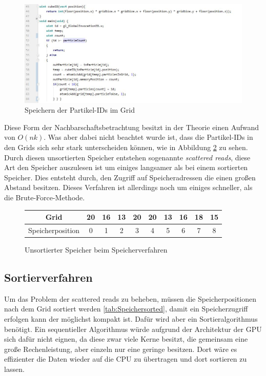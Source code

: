 \documentclass[intern,palatino]{cgBA}
\begin{document}
\begin{figure}[H]
	\centering
	\includegraphics[width=1.3\columnwidth]{Bilder/StoringLable.jpg}
	\caption{Speichern der Partikel-IDs im Grid }
	\label{img:Storinglable}
\end{figure}

Diese Form der Nachbarschaftsbetrachtung besitzt in der Theorie einen Aufwand von $O(n k)$. Was aber dabei nicht beachtet wurde ist, dass die Partikel-IDs in den Grids sich sehr stark unterscheiden können, wie in Abbildung \ref{tab:Speicher} zu sehen.
\newline
Durch diesen unsortierten Speicher entstehen sogenannte \textit{scattered reads}, diese Art den Speicher auszulesen ist um einiges langsamer als bei einem sortierten Speicher. Dies entsteht durch, den Zugriff auf Speicheradressen die einen großen Abstand besitzen.
\newline
Dieses Verfahren ist allerdings noch um einiges schneller, als die Brute-Force-Methode.

\begin{figure}[H]
	\centering
	\begin{tabular}{ | c || c | c | c | c | c | c | c | c | c |}
		\hline
		Grid 				&  20 & 16 & 13 & 20 & 20 & 13 & 16 & 18 & 15	\\ \hline
		Speicherposition	&   0 &  1 &  2 &  3 &  4 &  5 &  6 &  7 &  8	\\
		\hline
	\end{tabular}
	\caption{Unsortierter Speicher beim Speicherverfahren}
	\label{tab:Speicher}
\end{figure}


\subsection{Sortierverfahren}\label{sortieren}
Um das Problem der scattered reads zu beheben, müssen die Speicherpositionen nach dem Grid sortiert werden \ref{tab:Speichersorted}, damit ein Speicherzugriff erfolgen kann der möglichst kompakt ist. Dafür wird aber ein Sortieralgorithmus benötigt. Ein sequentieller Algorithmus würde aufgrund der Architektur der GPU sich dafür nicht eignen, da diese zwar viele Kerne besitzt, die gemeinsam eine große Rechenleistung, aber einzeln nur eine geringe besitzen. Dort wäre es effizienter die Daten wieder auf die CPU zu übertragen und dort sortieren zu lassen.
\end{document}

